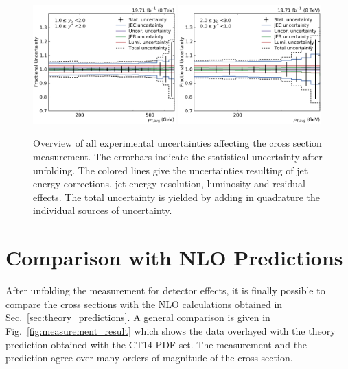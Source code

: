 \begin{figure}[htbp]
    \includegraphics[width=0.49\textwidth]{figures/measurement/exp_unc_overview_yb1ys1.pdf}\hfill
    \includegraphics[width=0.49\textwidth]{figures/measurement/exp_unc_overview_yb2ys0.pdf}
    \caption[Overview of experimental uncertainties]{Overview of all
    experimental uncertainties affecting the cross section measurement. The
    errorbars indicate the statistical uncertainty after unfolding. The colored
    lines give the uncertainties resulting of jet energy corrections, jet energy
    resolution, luminosity and residual effects. The total uncertainty is yielded by
    adding in quadrature the individual sources of uncertainty.}
    \label{fig:exp_unc_overview}
\end{figure}

\section{Comparison with NLO Predictions}
\label{sec:nlo_comparisons}

After unfolding the measurement for detector effects, it is finally possible to
compare the cross sections with the NLO calculations obtained in
Sec.~\ref{sec:theory_predictions}. A general comparison is given in
Fig.~\ref{fig:measurement_result} which shows the data overlayed with the
\NLOJETPP theory prediction obtained with the CT14 PDF set. The measurement and the
prediction agree over many orders of magnitude of the cross section.

